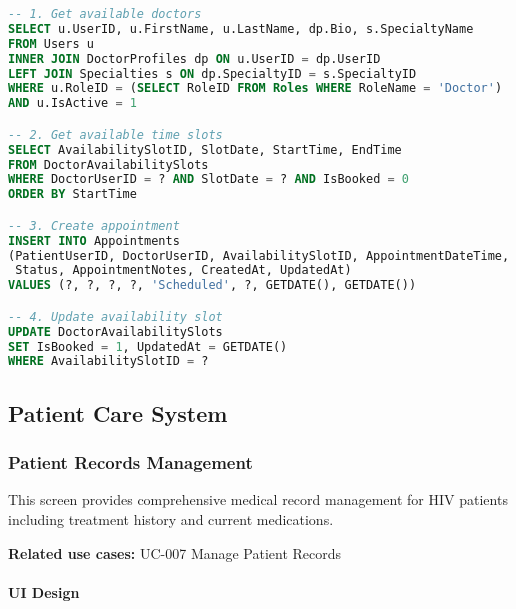 \documentclass[12pt,a4paper]{article}
\begin{document}
\begin{lstlisting}[language=SQL]
-- 1. Get available doctors
SELECT u.UserID, u.FirstName, u.LastName, dp.Bio, s.SpecialtyName
FROM Users u
INNER JOIN DoctorProfiles dp ON u.UserID = dp.UserID
LEFT JOIN Specialties s ON dp.SpecialtyID = s.SpecialtyID
WHERE u.RoleID = (SELECT RoleID FROM Roles WHERE RoleName = 'Doctor')
AND u.IsActive = 1

-- 2. Get available time slots
SELECT AvailabilitySlotID, SlotDate, StartTime, EndTime
FROM DoctorAvailabilitySlots
WHERE DoctorUserID = ? AND SlotDate = ? AND IsBooked = 0
ORDER BY StartTime

-- 3. Create appointment
INSERT INTO Appointments 
(PatientUserID, DoctorUserID, AvailabilitySlotID, AppointmentDateTime, 
 Status, AppointmentNotes, CreatedAt, UpdatedAt)
VALUES (?, ?, ?, ?, 'Scheduled', ?, GETDATE(), GETDATE())

-- 4. Update availability slot
UPDATE DoctorAvailabilitySlots 
SET IsBooked = 1, UpdatedAt = GETDATE()
WHERE AvailabilitySlotID = ?
\end{lstlisting}

\subsection{Patient Care System}

\subsubsection{Patient Records Management}

This screen provides comprehensive medical record management for HIV patients including treatment history and current medications.

\textbf{Related use cases:} UC-007 Manage Patient Records

\paragraph{UI Design}
\end{document}
